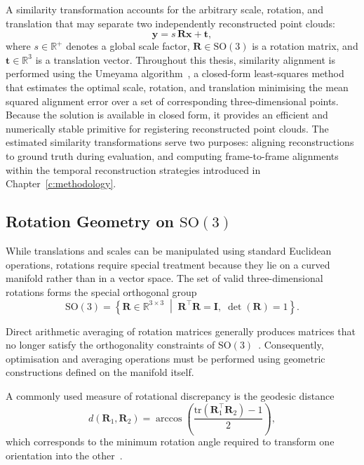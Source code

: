A similarity transformation accounts for the arbitrary scale, rotation, and
translation that may separate two independently reconstructed point clouds:
\begin{equation}
\mathbf{y} = s\,\mathbf{R}\mathbf{x} + \mathbf{t},
\end{equation}
where $s \in \mathbb{R}^{+}$ denotes a global scale factor,
$\mathbf{R} \in \mathrm{SO}(3)$ is a rotation matrix, and
$\mathbf{t} \in \mathbb{R}^{3}$ is a translation vector.
Throughout this thesis, similarity alignment is performed using the Umeyama
algorithm~\cite{umeyama1991least}, a closed-form least-squares method that
estimates the optimal scale, rotation, and translation minimising the mean
squared alignment error over a set of corresponding three-dimensional points.
Because the solution is available in closed form, it provides an efficient and
numerically stable primitive for registering reconstructed point clouds.
The estimated similarity transformations serve two purposes: aligning
reconstructions to ground truth during evaluation, and computing frame-to-frame
alignments within the temporal reconstruction strategies introduced in
Chapter~\ref{c:methodology}.
\subsection{Rotation Geometry on \texorpdfstring{$\mathrm{SO}(3)$}{SO(3)}}

While translations and scales can be manipulated using standard Euclidean operations, rotations require special treatment because they lie on a curved manifold rather than in a vector space. The set of valid three-dimensional rotations forms the special orthogonal group
\begin{equation}
\mathrm{SO}(3) = \left\{ \mathbf{R}\in\mathbb{R}^{3\times3} \;\middle|\; \mathbf{R}^{\top}\mathbf{R}=\mathbf{I},\; \det(\mathbf{R})=1 \right\}.
\end{equation}

Direct arithmetic averaging of rotation matrices generally produces matrices that no longer satisfy the orthogonality constraints of $\mathrm{SO}(3)$~\cite{absil2008optimization,chirikjian2011stochastic}. Consequently, optimisation and averaging operations must be performed using geometric constructions defined on the manifold itself.

A commonly used measure of rotational discrepancy is the geodesic distance
\begin{equation}
d(\mathbf{R}_1,\mathbf{R}_2) = \arccos\!\left(\frac{\mathrm{tr}\!\left(\mathbf{R}_1^{\top}\mathbf{R}_2\right)-1}{2}\right),
\end{equation}
which corresponds to the minimum rotation angle required to transform one orientation into the other~\cite{hartley2013rotation}.

